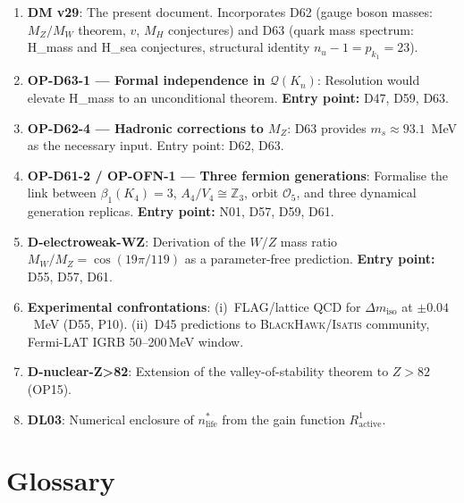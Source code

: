 \documentclass[11pt,a4paper]{article}
\theoremstyle{plain}
\theoremstyle{definition}
\theoremstyle{remark}
\begin{document}
\begin{enumerate}
\item \textbf{DM v29}: The present document. Incorporates D62 (gauge boson masses: $M_Z/M_W$ theorem, $v$, $M_H$ conjectures) and D63 (quark mass spectrum: H\_mass and H\_sea conjectures, structural identity $n_u - 1 = p_{k_1} = 23$).
\item \textbf{OP-D63-1 --- Formal independence in $\mathcal{Q}(K_n)$}: Resolution would elevate H\_mass to an unconditional theorem. \textbf{Entry point:} D47, D59, D63.
\item \textbf{OP-D62-4 --- Hadronic corrections to $M_Z$}: D63 provides $m_s \approx 93.1$~MeV as the necessary input. Entry point: D62, D63.
\item \textbf{OP-D61-2 / OP-OFN-1 --- Three fermion generations}: Formalise the link between $\beta_1(K_4) = 3$, $A_4/V_4 \cong \mathbb{Z}_3$, orbit $\mathcal{O}_5$, and three dynamical generation replicas. \textbf{Entry point:} N01, D57, D59, D61.
\item \textbf{D-electroweak-WZ}: Derivation of the $W/Z$ mass ratio $M_W/M_Z = \cos(19\pi/119)$ as a parameter-free prediction. \textbf{Entry point:} D55, D57, D61.
\item \textbf{Experimental confrontations}: (i)~FLAG/lattice QCD for $\Delta m_{\mathrm{iso}}$ at $\pm 0.04$~MeV (D55, P10). (ii)~D45 predictions to \textsc{BlackHawk}/\textsc{Isatis} community, Fermi-LAT IGRB 50--200\,MeV window.
\item \textbf{D-nuclear-Z>82}: Extension of the valley-of-stability theorem to $Z>82$ (OP15).
\item \textbf{DL03}: Numerical enclosure of $n^*_{\mathrm{life}}$ from the gain function $R^1_{\mathrm{active}}$.
\end{enumerate}

\section{Glossary}
\label{sec:glossary}
\end{document}
